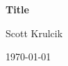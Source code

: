 \documentclass[11pt]{article}
\newcommand{\myname}{Scott Krulcik}
\newcommand{\mytitle}{Title}
\begin{document}
\centerline{\Large\bf \mytitle}
\centerline{\myname}
\centerline{\today}
\end{document}
